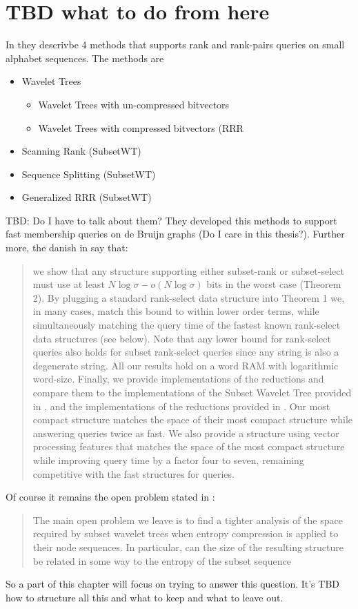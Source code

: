 \section{TBD what to do from here}
In \cite{SubsetWT} they descrivbe 4 methods that supports rank and rank-pairs queries on small alphabet sequences. The methods are
\begin{itemize}
    \item Wavelet Trees
        \begin{itemize}
            \item Wavelet Trees with un-compressed bitvectors
            \item Wavelet Trees with compressed bitvectors (RRR \cite{RRR2002}
        \end{itemize}
    \item Scanning Rank (SubsetWT)
    \item Sequence Splitting (SubsetWT)
    \item Generalized RRR (SubsetWT)
\end{itemize}
TBD: Do I have to talk about them? They developed this methods to support fast membership queries on de Bruijn graphs (Do I care in this thesis?). Further more, the danish in \cite{bille2023rank} say that:
\begin{quote}
    we show that any structure supporting either subset-rank or subset-select must use at least $N \log \sigma - o(N \log \sigma)$ bits in the worst case (Theorem 2). By plugging a standard rank-select data structure into Theorem 1 we, in many cases, match this bound to within lower order terms, while simultaneously matching the query time of the fastest known rank-select data structures (see below). Note that any lower bound for rank-select queries also holds for subset rank-select queries since any string is also a degenerate string. All our results hold on a word RAM with logarithmic word-size. Finally, we provide implementations of the reductions and compare them to the implementations of the Subset Wavelet Tree provided in \cite{SubsetWT}, and the implementations of the reductions provided in \cite{alanko2023small}. Our most compact structure matches the space of their most compact structure while answering queries twice as fast. We also provide a structure using vector processing features that matches the space of the most compact structure while improving query time by a factor four to seven, remaining competitive with the fast structures for queries.
\end{quote}
Of course it remains the open problem stated in \cite{SubsetWT}:
\begin{quote}
    The main open problem we leave is to find a tighter analysis of the space required by subset wavelet trees when entropy compression is applied to their node sequences. In particular, can the size of the resulting structure be related in some way to the entropy of the subset sequence
\end{quote}
So a part of this chapter will focus on trying to answer this question. It's TBD how to structure all this and what to keep and what to leave out.
